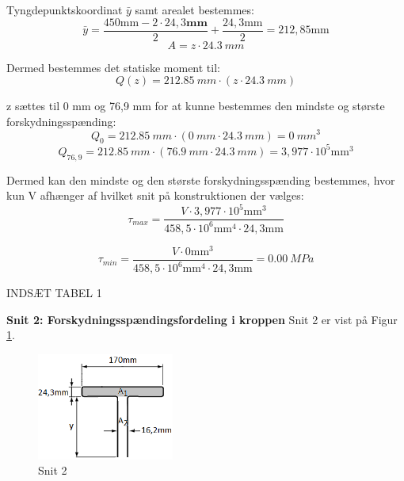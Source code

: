 Tyngdepunktskoordinat $\bar{y}$ samt arealet bestemmes:
\begin{equation}
\bar{y} = \frac{450 \text{mm} - 2 \cdot 24,\!3 \textbf{mm}}{2} + \frac{24,\!3 \text{mm}}{2} = 212,\!85 \text{mm}
\end{equation}
\begin{equation}
A = z \cdot \SI{24,3}{mm}
\end{equation}

Dermed bestemmes det statiske moment til:
\begin{equation}
Q(z) = \SI{212,85}{mm} \cdot (z \cdot \SI{24,3}{mm})
\end{equation}

z sættes til 0 mm og 76,9 mm for at kunne bestemmes den mindste og største forskydningsspænding:
\begin{equation}
Q_0 = \SI{212,85}{mm} \cdot (\SI{0}{mm} \cdot \SI{24,3}{mm}) = \SI{0}{mm^3}
\end{equation} 
\begin{equation}
	Q_{76,9} = \SI{212,85}{mm} \cdot (\SI{76,9}{mm} \cdot \SI{24,3}{mm}) =  3,\!977 \cdot 10^5 \text{mm}^3 
\end{equation}

Dermed kan den mindste og den største forskydningsspænding bestemmes, hvor kun V afhænger af hvilket snit på konstruktionen der vælges:
\begin{equation}
	\tau_{max} = \frac{V \cdot 3,977 \cdot 10^5 \text{mm}^3}{458,\!5 \cdot 10^6 \text{mm}^4 \cdot 24,\!3 \text{mm}}
\end{equation}

\begin{equation}
	\tau_{min} = \frac{V \cdot 0 \text{mm}^3}{458,\!5 \cdot 10^6 \text{mm}^4 \cdot 24,\!3 \text{mm}} = \SI{0,00}{MPa}
\end{equation}

INDSÆT TABEL 1

\textbf{Snit 2: Forskydningsspændingsfordeling i kroppen}
\newline
Snit 2 er vist på Figur \ref{fig:snittoforskyd}. 

\begin{figure}[H]
	\centering
	\includegraphics[width=0.4\textwidth]{billeder/snittoforskydning.png}
	\caption{Snit 2}
	\label{fig:snittoforskyd}
\end{figure}

